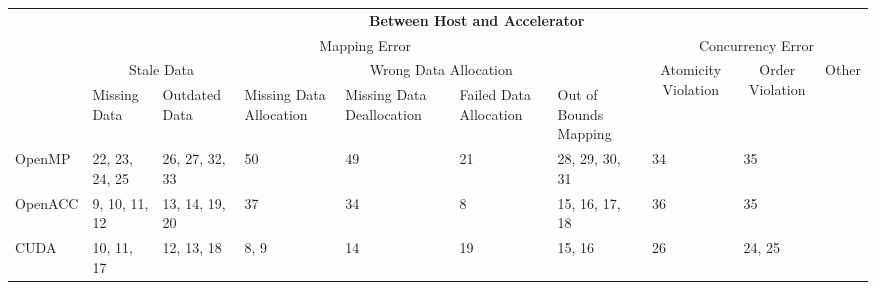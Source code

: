 \documentclass[border=10pt]{standalone}
\begin{document}
\begin{tabular}{|p{2cm}|p{1.5cm}|p{2cm}|p{2cm}|p{2cm}|p{2cm}|p{2cm}|p{2cm}|p{2cm}|p{1cm}|}
\hline
\multirow{4}{*}{} & \multicolumn{9}{c|}{\textbf{Between Host and Accelerator}}                                                                                                                                                                                                                                   \\ \cline{2-10} 
                  & \multicolumn{6}{c|}{Mapping Error}                                                                                                    & \multicolumn{3}{c|}{Concurrency Error}                                                                                                     \\ \cline{2-10} 
                  & \multicolumn{2}{c|}{Stale Data} & \multicolumn{4}{c|}{Wrong Data Allocation}                                                                   & \multicolumn{1}{c|}{\multirow{2}{2cm}{Atomicity Violation}} & \multicolumn{1}{c|}{\multirow{2}{2cm}{Order Violation}} & \multirow{2}{1cm}{Other} \\ \cline{2-7}
                  & Missing Data   & Outdated Data  & Missing Data Allocation & Missing Data Deallocation & Failed Data Allocation & Out of Bounds Mapping & \multicolumn{1}{c|}{}                                     & \multicolumn{1}{c|}{}                                 &                        \\ \hline
OpenMP            & 22, 23, 24, 25 & 26, 27, 32, 33 &                        50 & 49                        & 21                     & 28, 29, 30, 31        & 34                                                        & 35                                                    &                        \\ \hline
OpenACC           & 9, 10, 11, 12  & 13, 14, 19, 20 &                         37& 34                        & 8                      & 15, 16, 17, 18        &                                                          36 & 35                                                    &                        \\ \hline
CUDA              & 10, 11, 17         & 12, 13, 18        & 8, 9                    & 14                        & 19                     & 15, 16                &                                                           26& 24, 25                                                    &                        \\ \hline
\end{tabular}
\end{document}
